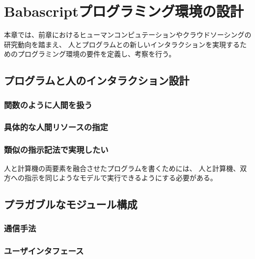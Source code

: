 \chapter{Babascriptプログラミング環境の設計}
\label{chap:design}

本章では、前章におけるヒューマンコンピュテーションやクラウドソーシングの研究動向を踏まえ、
人とプログラムとの新しいインタラクションを実現するためのプログラミング環境の要件を定義し、考察を行う。

\section{プログラムと人のインタラクション設計}\label{ux30d7ux30edux30b0ux30e9ux30e0ux3068ux4ebaux306eux30a4ux30f3ux30bfux30e9ux30afux30b7ux30e7ux30f3ux8a2dux8a08}

\subsection{関数のように人間を扱う}\label{ux95a2ux6570ux306eux3088ux3046ux306bux4ebaux9593ux3092ux6271ux3046}

\subsection{具体的な人間リソースの指定}\label{ux5177ux4f53ux7684ux306aux4ebaux9593ux30eaux30bdux30fcux30b9ux306eux6307ux5b9a}

\subsection{類似の指示記法で実現したい}\label{ux985eux4f3cux306eux6307ux793aux8a18ux6cd5ux3067ux5b9fux73feux3057ux305fux3044}

人と計算機の両要素を融合させたプログラムを書くためには、
人と計算機、双方への指示を同じようなモデルで実行できるようにする必要がある。

\section{プラガブルなモジュール構成}\label{ux30d7ux30e9ux30acux30d6ux30ebux306aux30e2ux30b8ux30e5ux30fcux30ebux69cbux6210}

\subsection{通信手法}\label{ux901aux4fe1ux624bux6cd5}

\subsection{ユーザインタフェース}\label{ux30e6ux30fcux30b6ux30a4ux30f3ux30bfux30d5ux30a7ux30fcux30b9}

